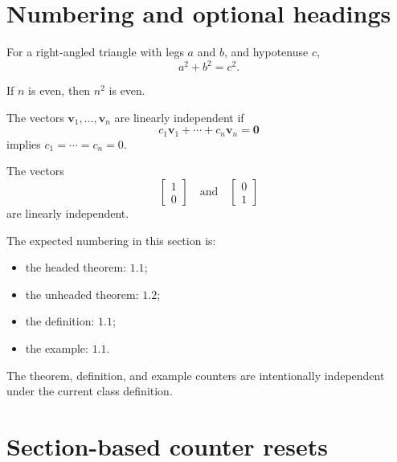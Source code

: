 \documentclass{studentnotes}
\begin{document}
\makenotetitle

\section{Numbering and optional headings}

\begin{theorem}
    \label{thm:pythagorean}
    For a right-angled triangle with legs \(a\) and \(b\), and
    hypotenuse \(c\),
    \[
        a^2+b^2=c^2.
    \]
\end{theorem}

\begin{theorem}
    \label{thm:unheaded}
    If \(n\) is even, then \(n^2\) is even.
\end{theorem}

\begin{definition}
    \label{def:linear-independence}
    The vectors \(\mathbf{v}_1,\ldots,\mathbf{v}_n\) are linearly
    independent if
    \[
        c_1\mathbf{v}_1+\cdots+c_n\mathbf{v}_n=\mathbf{0}
    \]
    implies \(c_1=\cdots=c_n=0\).
\end{definition}

\begin{example}
    \label{ex:independent-vectors}
    The vectors
    \[
        \begin{bmatrix}1\\0\end{bmatrix}
        \quad\text{and}\quad
        \begin{bmatrix}0\\1\end{bmatrix}
    \]
    are linearly independent.
\end{example}

The expected numbering in this section is:

\begin{itemize}
    \item the headed theorem: \(1.1\);
    \item the unheaded theorem: \(1.2\);
    \item the definition: \(1.1\);
    \item the example: \(1.1\).
\end{itemize}

The theorem, definition, and example counters are intentionally
independent under the current class definition.

\section{Section-based counter resets}
\end{document}
